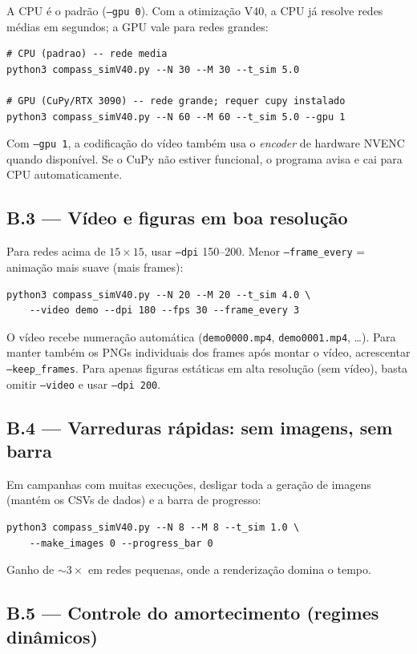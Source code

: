 \documentclass[11pt,a4paper]{article}
\newcommand{\code}[1]{\texttt{#1}}
\begin{document}
A CPU é o padrão (\code{--gpu 0}). Com a otimização V40, a CPU já
resolve redes médias em segundos; a GPU vale para redes grandes:
\begin{verbatim}
# CPU (padrao) -- rede media
python3 compass_simV40.py --N 30 --M 30 --t_sim 5.0

# GPU (CuPy/RTX 3090) -- rede grande; requer cupy instalado
python3 compass_simV40.py --N 60 --M 60 --t_sim 5.0 --gpu 1
\end{verbatim}
Com \code{--gpu 1}, a codificação do vídeo também usa o
\emph{encoder} de hardware NVENC quando disponível. Se o CuPy não
estiver funcional, o programa avisa e cai para CPU automaticamente.

\subsection*{B.3 --- Vídeo e figuras em boa resolução}

Para redes acima de $15\times15$, usar \code{--dpi} 150--200. Menor
\code{--frame\_every} = animação mais suave (mais frames):
\begin{verbatim}
python3 compass_simV40.py --N 20 --M 20 --t_sim 4.0 \
    --video demo --dpi 180 --fps 30 --frame_every 3
\end{verbatim}
O vídeo recebe numeração automática (\code{demo0000.mp4},
\code{demo0001.mp4}, \dots). Para manter também os PNGs individuais dos
frames após montar o vídeo, acrescentar \code{--keep\_frames}. Para
apenas figuras estáticas em alta resolução (sem vídeo), basta omitir
\code{--video} e usar \code{--dpi 200}.

\subsection*{B.4 --- Varreduras rápidas: sem imagens, sem barra}

Em campanhas com muitas execuções, desligar toda a geração de imagens
(mantém os CSVs de dados) e a barra de progresso:
\begin{verbatim}
python3 compass_simV40.py --N 8 --M 8 --t_sim 1.0 \
    --make_images 0 --progress_bar 0
\end{verbatim}
Ganho de $\sim 3\times$ em redes pequenas, onde a renderização domina o
tempo.

\subsection*{B.5 --- Controle do amortecimento (regimes dinâmicos)}
\end{document}
